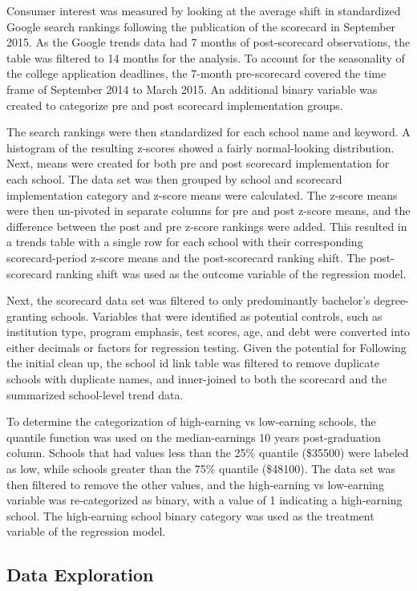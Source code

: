 \documentclass[
]{article}
\begin{document}
Consumer interest was measured by looking at the average shift in
standardized Google search rankings following the publication of the
scorecard in September 2015. As the Google trends data had 7 months of
post-scorecard observations, the table was filtered to 14 months for the
analysis. To account for the seasonality of the college application
deadlines, the 7-month pre-scorecard covered the time frame of September
2014 to March 2015. An additional binary variable was created to
categorize pre and post scorecard implementation groups.

The search rankings were then standardized for each school name and
keyword. A histogram of the resulting z-scores showed a fairly
normal-looking distribution. Next, means were created for both pre and
post scorecard implementation for each school. The data set was then
grouped by school and scorecard implementation category and z-score
means were calculated. The z-score means were then un-pivoted in
separate columns for pre and post z-score means, and the difference
between the post and pre z-score rankings were added. This resulted in a
trends table with a single row for each school with their corresponding
scorecard-period z-score means and the post-scorecard ranking shift. The
post-scorecard ranking shift was used as the outcome variable of the
regression model.

Next, the scorecard data set was filtered to only predominantly
bachelor's degree-granting schools. Variables that were identified as
potential controls, such as institution type, program emphasis, test
scores, age, and debt were converted into either decimals or factors for
regression testing. Given the potential for Following the initial clean
up, the school id link table was filtered to remove duplicate schools
with duplicate names, and inner-joined to both the scorecard and the
summarized school-level trend data.

To determine the categorization of high-earning vs low-earning schools,
the quantile function was used on the median-earnings 10 years
post-graduation column. Schools that had values less than the 25\%
quantile (\$35500) were labeled as low, while schools greater than the
75\% quantile (\$48100). The data set was then filtered to remove the
other values, and the high-earning vs low-earning variable was
re-categorized as binary, with a value of 1 indicating a high-earning
school. The high-earning school binary category was used as the
treatment variable of the regression model.

\hypertarget{data-exploration}{%
\subsection{Data Exploration}\label{data-exploration}}
\end{document}
